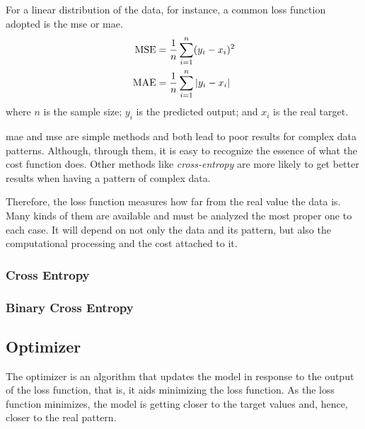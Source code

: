 For a linear distribution of the data, for instance, a common loss function adopted is the \gls*{mse} \citep{bussab2017} or \gls*{mae}.
%
\begin{align}
    \text{MSE} &= \frac{1}{n} \sum_{i=1}^n (y_i - x_i)^2
    \label{eq:mse} \\
    \text{MAE} &= \frac{1}{n} \sum_{i=1}^n |y_i - x_i|
    \label{eq:mae}
\end{align}
%
where \(n\) is the sample size; \(y_i\) is the predicted output; and \(x_i\) is the real target.

\gls*{mae} and \gls*{mse} are simple methods and both lead to poor results for complex data patterns.
Although, through them, it is easy to recognize the essence of what the cost function does. 
Other methods like \emph{cross-entropy} are more likely to get better results when having a pattern of complex data.

Therefore, the loss function measures how far from the real value the data is. Many kinds of them are available and must be analyzed the most proper one to each case. 
It will depend on not only the data and its pattern, but also the computational processing and the cost attached to it.

\subsubsection*{Cross Entropy}

\subsubsection*{Binary Cross Entropy}

\subsection{Optimizer}

The optimizer is an algorithm that updates the model in response to the output of the loss function, that is, it aids minimizing the loss function. 
As the loss function minimizes, the model is getting closer to the target values and, hence, closer to the real pattern.

